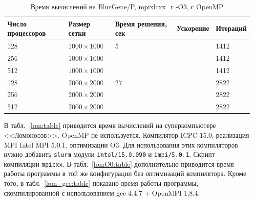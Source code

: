 \documentclass[12pt,notitlepage,oneside]{extarticle}
\begin{document}
\begin{table}[h]
\centering
\caption{Время вычислений на BlueGene/P, mpixlcxx\_r -O3, с OpenMP}
\label{bg_omp:table}
\begin{tabular}{|l|l|l|l|l|}
\textbf{Число процессоров} & \textbf{Размер сетки} & \textbf{Время решения, сек} & \textbf{Ускорение}  & \textbf{Итераций}        \\ \hline
128                        & $1000 \times 1000 $        & 5                      &                     & 1412                     \\
256                        & $1000 \times 1000 $        &                        &                     & 1412                         \\
512                        & $1000 \times 1000 $        &                        &                     & 1412                         \\ \hline
128                        & $2000 \times 2000 $        & 27                     &                     & 2822                     \\
256                        & $2000 \times 2000 $        &                        &                     & 2822                         \\
512                        & $2000 \times 2000 $        &                        &                     & 2822
\end{tabular}
\end{table}

В табл.~\ref{lom:table} приводится время вычислений на суперкомпьютере
<<Ломоносов>>, OpenMP не используется. Компилятор ICPC 15.0, реализация MPI
Intel MPI 5.0.1, оптимизации O3. Для использования этих компиляторов нужно
добавить \texttt{slurm} модули \texttt{intel/15.0.090} и \texttt{impi/5.0.1}.
Скрипт компиляции \texttt{mpicxx}. В табл.~\ref{lomO0:table} дополнительно
приводится время работы программы в той же конфигурации без оптимизаций
компилятора. Кроме того, в табл.~\ref{lom_gcc:table} показано
время работы программы, скомпилированной с использованием gcc 4.4.7 + OpenMPI
1.8.4.
\end{document}
